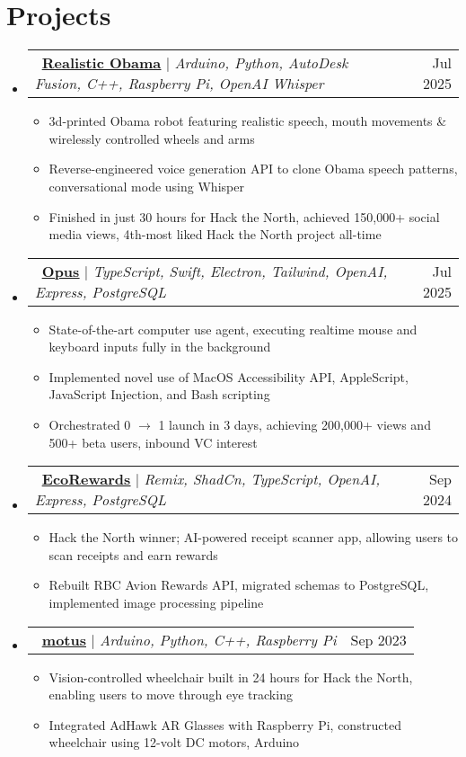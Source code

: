 \documentclass[letterpaper,11pt]{article}
\makeatletter
\newcommand{\resumeItem}[1]{
  \item\small{
    {#1 \vspace{-2pt}}
  }
}
\newcommand{\resumeProjectHeading}[2]{
    \item
    \begin{tabular*}{0.97\textwidth}{l@{\extracolsep{\fill}}r}
      \small#1 & #2 \\
    \end{tabular*}\vspace{-7pt}
}
\newcommand{\resumeSubHeadingListStart}{\begin{itemize}[leftmargin=0.15in, label={}]}
\newcommand{\resumeSubHeadingListEnd}{\end{itemize}}
\newcommand{\resumeItemListStart}{\begin{itemize}}
\newcommand{\resumeItemListEnd}{\end{itemize}\vspace{-5pt}}
\makeatother
\begin{document}
\section{Projects}
    \resumeSubHeadingListStart
    \resumeProjectHeading
      {\faGithub\ \href{https://github.com/yourself1011/obama}{\textbf{\underline{Realistic Obama}}} $|$ \emph{Arduino, Python, AutoDesk Fusion, C++, Raspberry Pi, OpenAI Whisper}}{Jul 2025}
      \resumeItemListStart
        \resumeItem{3d-printed Obama robot featuring realistic speech, mouth movements \& wirelessly controlled wheels and arms}
        \resumeItem{Reverse-engineered voice generation API to clone Obama speech patterns, conversational mode using Whisper}
        \resumeItem{Finished in just 30 hours for Hack the North, achieved 150,000+ social media views, 4th-most liked Hack the North project all-time}
      \resumeItemListEnd
      \resumeProjectHeading
          {\faGithub\ \href{https://github.com/jeffrey-zang/opus}{\textbf{\underline{Opus}}} $|$ \emph{TypeScript, Swift, Electron, Tailwind, OpenAI, Express, PostgreSQL}}{Jul 2025}
          \resumeItemListStart
            \resumeItem{State-of-the-art computer use agent, executing realtime mouse and keyboard inputs fully in the background}
            \resumeItem{Implemented novel use of MacOS Accessibility API, AppleScript, JavaScript Injection, and Bash scripting}
            \resumeItem{Orchestrated 0 \(\rightarrow\) 1 launch in 3 days, achieving 200,000+ views and 500+ beta users, inbound VC interest}
          \resumeItemListEnd
      \resumeProjectHeading
          {\faGithub\ \href{https://github.com/jeffrey-zang/ecorewards}{\textbf{\underline{EcoRewards}}} $|$ \emph{Remix, ShadCn, TypeScript, OpenAI, Express, PostgreSQL}}{Sep 2024}
          \resumeItemListStart
            \resumeItem{Hack the North winner; AI-powered receipt scanner app, allowing users to scan receipts and earn rewards}
            \resumeItem{Rebuilt RBC Avion Rewards API, migrated schemas to PostgreSQL, implemented image processing pipeline}
          \resumeItemListEnd
      \resumeProjectHeading
        {\faGithub\ \href{https://github.com/jeffrey-zang/motus}{\textbf{\underline{motus}}} $|$ \emph{Arduino, Python, C++, Raspberry Pi}}{Sep 2023}
          \resumeItemListStart
            \resumeItem{Vision-controlled wheelchair built in 24 hours for Hack the North, enabling users to move through eye tracking}
            \resumeItem{Integrated AdHawk AR Glasses with Raspberry Pi, constructed wheelchair using 12-volt DC motors, Arduino}
          \resumeItemListEnd
    \resumeSubHeadingListEnd
\end{document}
